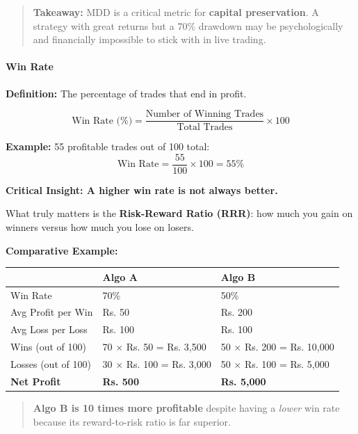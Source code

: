 \documentclass[12pt,openany]{book}
\begin{document}
\begin{quote}
    \textbf{Takeaway:} MDD is a critical metric for \textbf{capital preservation}. A strategy with great returns but a 70\% drawdown may be psychologically and financially impossible to stick with in live trading.
\end{quote}

\paragraph{Win Rate}

\textbf{Definition:} The percentage of trades that end in profit.

\begin{equation*}
    \text{Win Rate (\%)} = \frac{\text{Number of Winning Trades}}{\text{Total Trades}} \times 100
\end{equation*}

\textbf{Example:} 55 profitable trades out of 100 total:
\begin{equation*}
    \text{Win Rate} = \frac{55}{100} \times 100 = 55\%
\end{equation*}

\textbf{Critical Insight: A higher win rate is not always better.}

What truly matters is the \textbf{Risk-Reward Ratio (RRR)}: how much you gain on winners versus how much you lose on losers.

\textbf{Comparative Example:}

\begin{center}
\begin{tabular}{|L{0.27\textwidth}|L{0.28\textwidth}|L{0.28\textwidth}|}
\hline
 & \textbf{Algo A} & \textbf{Algo B} \\
\hline
Win Rate & 70\% & 50\% \\
\hline
Avg Profit per Win & Rs. 50 & Rs. 200 \\
\hline
Avg Loss per Loss & Rs. 100 & Rs. 100 \\
\hline
Wins (out of 100) & 70 $\times$ Rs. 50 = Rs. 3,500 & 50 $\times$ Rs. 200 = Rs. 10,000 \\
\hline
Losses (out of 100) & 30 $\times$ Rs. 100 = Rs. 3,000 & 50 $\times$ Rs. 100 = Rs. 5,000 \\
\hline
\textbf{Net Profit} & \textbf{Rs. 500} & \textbf{Rs. 5,000} \\
\hline
\end{tabular}
\end{center}

\begin{quote}
    \textbf{Algo B is 10 times more profitable} despite having a \emph{lower} win rate because its reward-to-risk ratio is far superior.
\end{quote}
\end{document}
